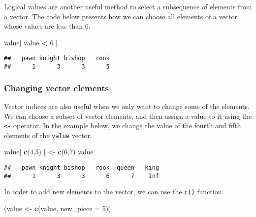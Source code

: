 \documentclass[]{book}
\newenvironment{Shaded}{\begin{snugshade}}{\end{snugshade}}
\newcommand{\KeywordTok}[1]{\textcolor[rgb]{0.13,0.29,0.53}{\textbf{#1}}}
\newcommand{\DataTypeTok}[1]{\textcolor[rgb]{0.13,0.29,0.53}{#1}}
\newcommand{\DecValTok}[1]{\textcolor[rgb]{0.00,0.00,0.81}{#1}}
\newcommand{\StringTok}[1]{\textcolor[rgb]{0.31,0.60,0.02}{#1}}
\newcommand{\OperatorTok}[1]{\textcolor[rgb]{0.81,0.36,0.00}{\textbf{#1}}}
\newcommand{\NormalTok}[1]{#1}
\theoremstyle{definition}
\theoremstyle{definition}
\theoremstyle{definition}
\theoremstyle{remark}
\begin{document}
Logical values are another useful method to select a subsequence of
elements from a vector. The code below presents how we can choose all
elements of a vector whose values are less than 6.

\begin{Shaded}
\begin{Highlighting}[]
\NormalTok{value[ value }\OperatorTok{<}\StringTok{ }\DecValTok{6}\NormalTok{ ]}
\end{Highlighting}
\end{Shaded}

\begin{verbatim}
##   pawn knight bishop   rook 
##      1      3      3      5
\end{verbatim}

\subsubsection{Changing vector elements}\label{part_2212}

Vector indices are also useful when we only want to change some of the
elements. We can choose a subset of vector elements, and then assign a
value to it using the \texttt{\textless{}-} operator. In the example
below, we change the value of the fourth and fifth elements of the
\texttt{value} vector.

\begin{Shaded}
\begin{Highlighting}[]
\NormalTok{value[ }\KeywordTok{c}\NormalTok{(}\DecValTok{4}\NormalTok{,}\DecValTok{5}\NormalTok{) ] <-}\StringTok{ }\KeywordTok{c}\NormalTok{(}\DecValTok{6}\NormalTok{,}\DecValTok{7}\NormalTok{)}
\NormalTok{value}
\end{Highlighting}
\end{Shaded}

\begin{verbatim}
##   pawn knight bishop   rook  queen   king 
##      1      3      3      6      7    Inf
\end{verbatim}

In order to add new elements to the vector, we can use the \texttt{c()}
function.

\begin{Shaded}
\begin{Highlighting}[]
\NormalTok{(value <-}\StringTok{ }\KeywordTok{c}\NormalTok{(value, }\DataTypeTok{new_piece =} \DecValTok{5}\NormalTok{))}
\end{Highlighting}
\end{Shaded}
\end{document}
